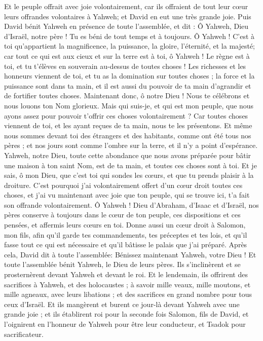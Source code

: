 \begin{multicols}{2}
Et le peuple offrait avec joie volontairement, car ils offraient de tout leur cœur leurs offrandes volontaires à Yahweh; et David en eut une très grande joie.
Puis David bénit Yahweh en présence de toute l'assemblée, et dit : Ô Yahweh, Dieu d'Israël, notre père ! Tu es béni de tout temps et à toujours.
Ô Yahweh ! C’est à toi qu'appartient la magnificence, la puissance, la gloire, l'éternité, et la majesté; car tout ce qui est aux cieux et sur la terre est à toi, ô Yahweh ! Le règne est à toi, et tu t'élèves en souverain au-dessus de toutes choses !
Les richesses et les honneurs viennent de toi, et tu as la domination sur toutes choses ; la force et la puissance sont dans ta main, et il est aussi du pouvoir de ta main d'agrandir et de fortifier toutes choses.
Maintenant donc, ô notre Dieu ! Nous te célébrons et nous louons ton Nom glorieux.
Mais qui suis-je, et qui est mon peuple, que nous ayons assez pour pouvoir t’offrir ces choses volontairement ? Car toutes choses viennent de toi, et les ayant reçues de ta main, nous te les présentons.
Et même nous sommes devant toi des étrangers et des habitants, comme ont été tous nos pères ; et nos jours sont comme l'ombre sur la terre, et il n'y a point d’espérance.
Yahweh, notre Dieu,  toute cette abondance que nous avons préparée pour bâtir une maison à ton saint Nom, est de ta main, et toutes ces choses sont à toi.
Et je sais, ô mon Dieu, que c'est toi qui sondes les cœurs, et que tu prends plaisir à la droiture. C'est pourquoi j'ai volontairement offert d'un cœur droit toutes ces choses, et j'ai vu maintenant avec joie que ton peuple, qui se trouve ici, t'a fait son offrande volontairement.
Ô Yahweh ! Dieu d'Abraham, d'Isaac et d'Israël, nos pères conserve à toujours dans le cœur de ton peuple, ces dispositions et ces pensées, et affermis leurs cœurs en toi.
Donne aussi un cœur droit à Salomon, mon fils, afin qu'il garde tes commandements, tes préceptes et tes lois, et qu'il fasse tout ce qui est nécessaire et qu'il bâtisse le palais que j'ai préparé.
Après cela, David dit à toute l'assemblée: Bénissez maintenant Yahweh, votre Dieu ! Et toute l'assemblée bénit Yahweh, le Dieu de leurs pères. Ils s'inclinèrent et se prosternèrent devant Yahweh et devant le roi.
Et le lendemain, ils offrirent des sacrifices à Yahweh, et des holocaustes ; à savoir mille veaux, mille moutons, et mille agneaux, avec leurs libations ; et des sacrifices en grand nombre pour tous ceux d'Israël.
Et ils mangèrent et burent ce jour-là devant Yahweh avec une grande joie ; et ils établirent roi pour la seconde fois Salomon, fils de David, et l'oignirent en l'honneur de Yahweh pour être leur conducteur, et Tsadok pour sacrificateur.

\end{multicols}
